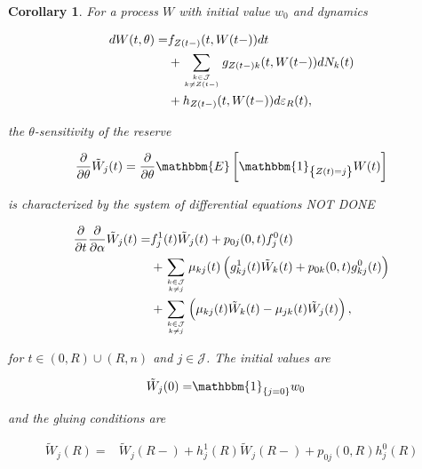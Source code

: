\documentclass{article}
\newcommand{\1}[1]{\mathbbm{1}_{\left\lbrace #1 \right\rbrace}}
\newcommand{\expec}[1][def]{\mathbbm{E} \left[ #1 \right]}
\theoremstyle{break}
\newtheorem{corollary}[definition]{Corollary}
\theoremstyle{remark}
\numberwithin{equation}{section}
\begin{document}
\begin{corollary} \label{Corollary}
	For a process $W$ with initial value $w_0$ and dynamics
	
	\begin{align*}
		dW(t,\theta) =& f_{Z(t-)}(t,W(t-)) dt \\
		&+ \sum_{k \in \mathcal{J} \atop k \neq Z(t-)} g_{Z(t-)k}(t,W(t-)) dN_{k}(t) \\
		&+ h_{Z(t-)}(t,W(t-)) d \varepsilon_R(t),
	\end{align*}

	the $\theta$-sensitivity of the reserve
	
	\begin{align*}
		\frac{\partial}{\partial \theta} \tilde{W}_j(t) = \frac{\partial}{\partial \theta} \expec[\1{Z(t)=j} W(t)]
	\end{align*}
	
	is characterized by the system of differential equations NOT DONE
	
	\begin{align*}
		\frac{\partial}{\partial t} \frac{\partial}{\partial \alpha} \tilde{W}_j(t) =& f_j^1(t) \tilde{W}_j(t) + p_{0j}(0,t) f_j^0(t) \\
		&+ \sum_{k \in \mathcal{J} \atop k \neq j} \mu_{kj}(t) \left( g_{kj}^1(t) \tilde{W}_k(t) + p_{0k}(0,t) g_{kj}^0(t) \right) \\
		&+ \sum_{k \in \mathcal{J} \atop k \neq j} \left( \mu_{kj}(t) \tilde{W}_k(t) - \mu_{jk}(t) \tilde{W}_j(t) \right),
	\end{align*}
	
	for $t \in (0,R)\cup(R,n)$ and $j \in \mathcal{J}$. The initial values are
	
	\begin{align*}
		\tilde{W}_j(0) =& \1{j=0} w_0
	\end{align*}
	
	and the gluing conditions are
	
	\begin{align*}
		\tilde{W}_j(R) =& \tilde{W}_j(R-) + h_j^1(R) \tilde{W}_j(R-) + p_{0j}(0,R) h_j^0(R)
	\end{align*}
\end{corollary}
\end{document}
